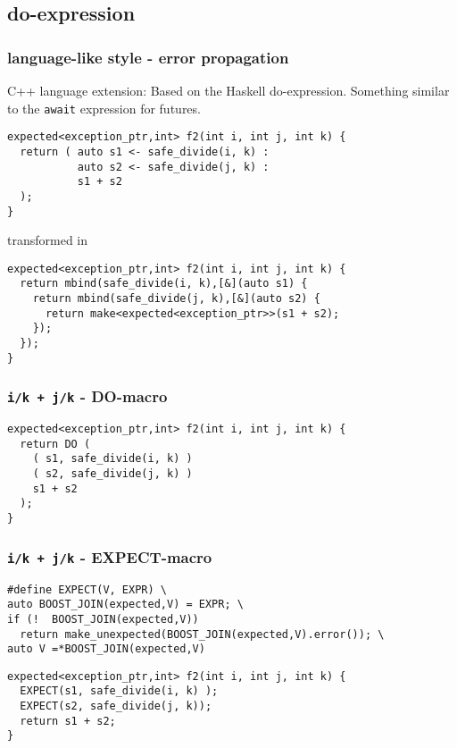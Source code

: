 \documentclass[xcolor=dvipsnames]{beamer}
\newcommand{\cpp}[1]{\lstinline{#1}}
\begin{document}
\subsection{do-expression}
\begin{frame}[fragile]
\frametitle{language-like style  - error propagation}
C++ language extension: Based on the Haskell do-expression. Something similar to the \cpp{await} expression for futures.  

\begin{lstlisting}
expected<exception_ptr,int> f2(int i, int j, int k) {
  return ( auto s1 <- safe_divide(i, k) :
           auto s2 <- safe_divide(j, k) :
           s1 + s2  
  );
}
\end{lstlisting}

transformed in 

\begin{lstlisting}
expected<exception_ptr,int> f2(int i, int j, int k) {
  return mbind(safe_divide(i, k),[&](auto s1) {
    return mbind(safe_divide(j, k),[&](auto s2) {
      return make<expected<exception_ptr>>(s1 + s2);
    });
  }); 
}
\end{lstlisting}
\end{frame}
\begin{frame}[fragile]
\frametitle{\cpp{i/k + j/k}  - DO-macro}

\begin{lstlisting}
expected<exception_ptr,int> f2(int i, int j, int k) {
  return DO (
    ( s1, safe_divide(i, k) )
    ( s2, safe_divide(j, k) )
    s1 + s2 
  );
}
\end{lstlisting}

\end{frame}
\begin{frame}[fragile]
\frametitle{\cpp{i/k + j/k}  - EXPECT-macro}

\begin{lstlisting}
#define EXPECT(V, EXPR) \
auto BOOST_JOIN(expected,V) = EXPR; \
if (!  BOOST_JOIN(expected,V)) 
  return make_unexpected(BOOST_JOIN(expected,V).error()); \
auto V =*BOOST_JOIN(expected,V)
\end{lstlisting}

\begin{lstlisting}
expected<exception_ptr,int> f2(int i, int j, int k) {
  EXPECT(s1, safe_divide(i, k) );
  EXPECT(s2, safe_divide(j, k));
  return s1 + s2;
}
\end{lstlisting}

\end{frame}
\end{document}
